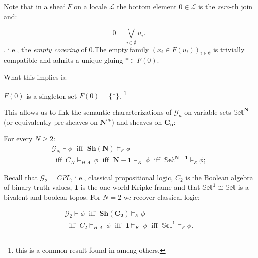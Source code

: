   Note that in a sheaf $F$ on a locale $\mathcal{L}$ the bottom element $0 \in \mathcal{L}$ is the \emph{zero}-th join and:
  
  \begin{remark} 
  	\begin{equation*}
  		0 = \bigvee_{i \in \emptyset} u_i.
  	\end{equation*}
  	, i.e., the \emph{empty covering} of $0$.\newline The empty family $(x_i \in F(u_i))_{i \in \emptyset}$ is trivially compatible and admits a unique gluing $* \in F(0)$.\newline
  \end{remark}
  
  What this implies is:
  
  \begin{lem}
  	$F(0)$ is a singleton set $F(0)=\{*\}$. \footnote{this is a common result found in \cite{borceaux} among others.}
  \end{lem}
  This allows us to link the semantic characterizations of $\mathcal{G}_n$ on variable sets $\mathbb{Set}^\mathbf{N}$ (or equivalently pre-sheaves on $\mathbf{N}^{op}$) and sheaves on $\mathbf{C_n}$:
  
  \begin{prop}
  	  For every $N \geq 2$:
  	  	\begin{gather*}
  		\mathcal{G}_{N} \vdash \phi   \;\text{ iff }\;\mathbf{Sh}(\mathbf{N}) \models_{\mathcal{E}} \phi 
  		\\ \;\text{ iff }\; C_{N} \models_{H.A.} \phi\;\text{ iff }\;\mathbf{N-1} \models_{K.} \phi \;\text{ iff }\ \mathbb{Set}^\mathbf{N-1} \models_{\mathcal{E}} \phi ;   
  	\end{gather*}
  \end{prop}
  Recall that $\mathcal{G}_{2}= CPL$, i.e., classical propositional logic, $C_{2}$ is the Boolean algebra of binary truth values, $\mathbf{1}$ is the one-world Kripke frame and that $\mathbb{Set}^\mathbf{1} \cong \mathbb{Set}$ is a bivalent and boolean topos.
  \newline
  For $N=2$ we recover classical logic:
  \begin{prop}
  	\begin{gather*}
  		\mathcal{G}_{2} \vdash \phi \;\text{ iff }\;\mathbf{Sh}(\mathbf{C_{2}}) 
  		\models_{\mathcal{E}} \phi \\ \;\text{ iff }\; C_{2} \models_{H.A.} \phi  \;\text{ iff }\; \mathbf{1} \models_{K.} \phi  \;\text{ iff }\; \mathbb{Set}^\mathbf{1} \models_{\mathcal{E}} \phi.     
  	\end{gather*}
  	\end{prop}
  
